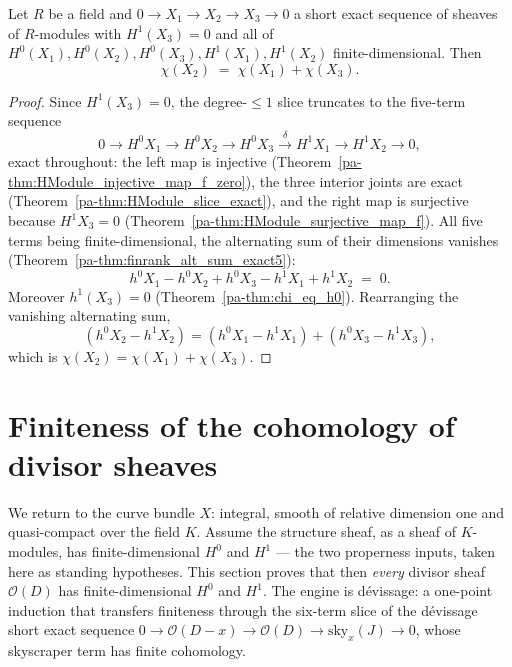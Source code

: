 \begin{theorem}
  \label{pa-thm:chi_eq_add_of_shortExact}
  \leanok

  Let \(R\) be a field and \(0 \to X_1 \to X_2 \to X_3 \to 0\) a short exact sequence of sheaves
  of \(R\)-modules with \(H^1(X_3) = 0\) and all of \(H^0(X_1), H^0(X_2), H^0(X_3), H^1(X_1),
  H^1(X_2)\) finite-dimensional. Then
  \[
    \chi(X_2) \;=\; \chi(X_1) + \chi(X_3).
  \]
\end{theorem}
\begin{proof}
  \leanok
  Since \(H^1(X_3) = 0\), the degree-\(\le 1\) slice truncates to the five-term sequence
  \[
    0 \to H^0 X_1 \to H^0 X_2 \to H^0 X_3 \xrightarrow{\delta}
      H^1 X_1 \to H^1 X_2 \to 0,
  \]
  exact throughout: the left map is injective (Theorem~\ref{pa-thm:HModule_injective_map_f_zero}),
  the three interior joints are exact (Theorem~\ref{pa-thm:HModule_slice_exact}), and the right map
  is surjective because \(H^1 X_3 = 0\) (Theorem~\ref{pa-thm:HModule_surjective_map_f}). All five
  terms being finite-dimensional, the alternating sum of their dimensions vanishes
  (Theorem~\ref{pa-thm:finrank_alt_sum_exact5}):
  \[
    h^0 X_1 - h^0 X_2 + h^0 X_3 - h^1 X_1 + h^1 X_2 \;=\; 0 .
  \]
  Moreover \(h^1(X_3) = 0\) (Theorem~\ref{pa-thm:chi_eq_h0}). Rearranging the vanishing alternating
  sum,
  \[
    (h^0 X_2 - h^1 X_2) = (h^0 X_1 - h^1 X_1) + (h^0 X_3 - h^1 X_3),
  \]
  which is \(\chi(X_2) = \chi(X_1) + \chi(X_3)\).
\end{proof}

\section{Finiteness of the cohomology of divisor sheaves}

We return to the curve bundle \(X\): integral, smooth of relative dimension one and quasi-compact
over the field \(K\). Assume the structure sheaf, as a sheaf of \(K\)-modules, has
finite-dimensional \(H^0\) and \(H^1\) --- the two properness inputs, taken here as standing
hypotheses. This section proves that then \emph{every} divisor sheaf \(\mathcal O(D)\) has
finite-dimensional \(H^0\) and \(H^1\). The engine is dévissage: a one-point induction that
transfers finiteness through the six-term slice of the dévissage short exact sequence
\(0 \to \mathcal O(D-x) \to \mathcal O(D) \to \mathrm{sky}_x(J) \to 0\), whose skyscraper term
has finite cohomology.

